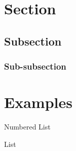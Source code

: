 \documentclass[12pt]{article}
\begin{document}


\clearpage

\tableofcontents

\clearpage

\section{Section}\label{sec:section}

\blindtext

\subsection{Subsection}\label{subsec:subsection}

\blindtext

\subsubsection{Sub-subsection}

\blindtext

\section{Examples}\label{sec:examples}

Numbered List
\blindenumerate

List
\blinditemize




\clearpage

\printbibliography[
    heading=bibintoc,
    title= {Bibliography}
]\label{sec:bibliography}
\end{document}

